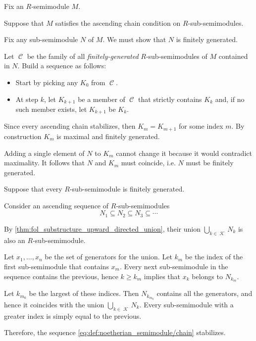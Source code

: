 \begin{defproof}
  Fix an \( R \)-semimodule \( M \).

   Suppose that \( M \) satisfies the ascending chain condition on \( R \)-sub-semimodules.

  Fix any sub-semimodule \( N \) of \( M \). We must show that \( N \) is finitely generated.

  Let \( \mscrC \) be the family of all \emph{finitely-generated} \( R \)-sub-semimodules of \( M \) contained in \( N \). Build a sequence as follows:
  \begin{itemize}
    \item Start by picking any \( K_0 \) from \( \mscrC \).
    \item At step \( k \), let \( K_{k+1} \) be a member of \( \mscrC \) that strictly contains \( K_k \) and, if no such member exists, let \( K_{k+1} \) be \( K_k \).
  \end{itemize}

  Since every ascending chain stabilizes, then \( K_m = K_{m+1} \) for some index \( m \). By construction \( K_m \) is maximal and finitely generated.

  Adding a single element of \( N \) to \( K_m \) cannot change it because it would contradict maximality. It follows that \( N \) and \( K_m \) must coincide, i.e. \( N \) must be finitely generated.

   Suppose that every \( R \)-sub-semimodule is finitely generated.

  Consider an ascending sequence of \( R \)-sub-semimodules
  \begin{equation}\label{eq:def:noetherian_semimodule/chain}
    N_1 \subseteq N_2 \subseteq N_3 \subseteq \cdots
  \end{equation}

  By \cref{thm:fol_substructure_upward_directed_union}, their union \( \bigcup_{k \in \mscrK} N_k \) is also an \( R \)-sub-semimodule.

  Let \( x_1, \ldots, x_n \) be the set of generators for the union. Let \( k_m \) be the index of the first sub-semimodule that contains \( x_m \). Every next sub-semimodule in the sequence contains the previous, hence \( k \geq k_m \) implies that \( x_k \) belongs to \( N_{k_m} \).

  Let \( k_{m_0} \) be the largest of these indices. Then \( N_{k_{m_0}} \) contains all the generators, and hence it coincides with the union \( \bigcup_{k \in \mscrK} N_k \). Every sub-semimodule with a greater index is simply equal to the previous.

  Therefore, the sequence \eqref{eq:def:noetherian_semimodule/chain} stabilizes.
\end{defproof}

